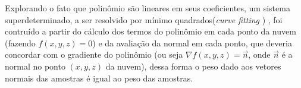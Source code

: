 Explorando o fato que polinômio são lineares em seus coeficientes, um sistema
superdeterminado, a ser resolvido por mínimo quadrados(\textit{curve fitting}
\cite{arlinghaus1994practical}) , foi contruído a partir do cálculo dos termos
do polinômio em cada ponto da nuvem (fazendo $f(x,y,z)=0$) e da avaliação da
normal em cada ponto, que deveria concordar com o gradiente do polinômio (ou
seja $\nabla f(x,y,z) = \overrightarrow{n}$, onde $\overrightarrow{n}$ é a
normal no ponto $(x,y,z)$ da nuvem), dessa forma o peso dado aos vetores normais
das amostras é igual ao peso das amostras.



% 
